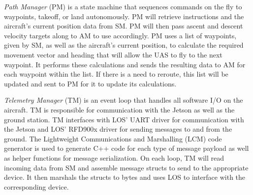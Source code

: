 \textit{Path Manager} (PM) is a state machine that sequences commands on the
fly to waypoints, takeoff, or land autonomously. PM will retrieve instructions
and the aircraft's current position data from SM. PM will then pass ascent and
descent velocity targets along to AM to use accordingly. PM uses a list of
waypoints, given by SM, as well as the aircraft's current position, to
calculate the required movement vector and heading that will allow the UAS to
fly to the next waypoint. It performs these calculations and sends the
resulting data to AM for each waypoint within the list. If there is a need to
reroute, this list will be updated and sent to PM for it to update its
calculations.

\textit{Telemetry Manager} (TM) is an event loop that handles all software I/O
on the aircraft. TM is responsible for communication with the Jetson as well as
the ground station. TM interfaces with LOS' UART driver for communication with
the Jetson and LOS' RFD900x driver for sending messages to and from the ground.
The Lightweight Communications and Marshalling (LCM) code generator is used to
generate C++ code for each type of message payload as well as helper functions
for message serialization. On each loop, TM will read incoming data from SM and
assemble message structs to send to the appropriate device. It then marshals
the structs to bytes and uses LOS to interface with the corresponding device.
